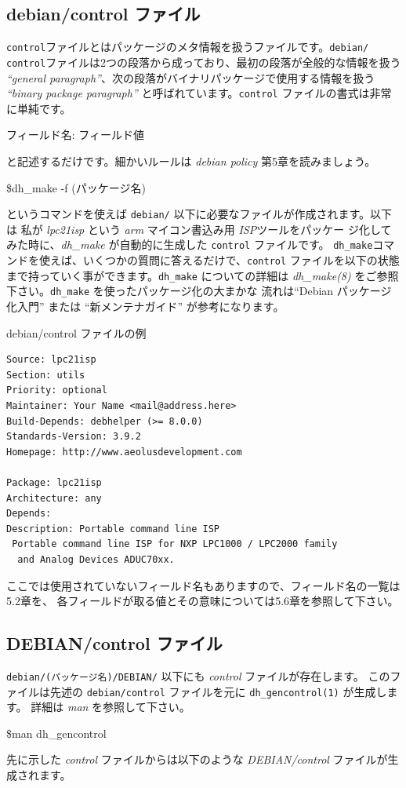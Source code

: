 \documentclass[mingoth,a4paper]{jsarticle}
\begin{document}
\subsection{debian/control ファイル}
{\tt control}ファイルとはパッケージのメタ情報を扱うファイルです。{\tt debian/
control}ファイルは2つの段落から成っており、最初の段落が全般的な情報を扱う {\it
``general paragraph''}、次の段落がバイナリパッケージで使用する情報を扱う {\it
``binary package paragraph''} と呼ばれています。{\tt control} ファイルの書式は非常
に単純です。
\begin{screen}
フィールド名: フィールド値
\end{screen}
と記述するだけです。細かいルールは {\it debian policy} 第5章を読みましょう。
\begin{screen}
\$dh\_make -f (パッケージ名)
\end{screen}
というコマンドを使えば {\tt debian/} 以下に必要なファイルが作成されます。以下は
私が {\it lpc21isp} という {\it arm} マイコン書込み用 {\it ISP}ツールをパッケー
ジ化してみた時に、{\it dh\_make} が自動的に生成した {\tt control} ファイルです。
{\tt dh\_make}コマンドを使えば、いくつかの質問に答えるだけで、{\tt control}
ファイルを以下の状態まで持っていく事ができます。{\tt dh\_make} についての詳細は
{\it dh\_make(8)} をご参照下さい。{\tt dh\_make} を使ったパッケージ化の大まかな
流れは``Debian パッケージ化入門''\cite{packaging-tutorial}
または ``新メンテナガイド''\cite{maint-guide-ja}
が参考になります。
\begin{itembox}[l]{debian/control ファイルの例}
\begin{verbatim}
Source: lpc21isp
Section: utils
Priority: optional
Maintainer: Your Name <mail@address.here>
Build-Depends: debhelper (>= 8.0.0)
Standards-Version: 3.9.2
Homepage: http://www.aeolusdevelopment.com

Package: lpc21isp
Architecture: any
Depends:
Description: Portable command line ISP
 Portable command line ISP for NXP LPC1000 / LPC2000 family
  and Analog Devices ADUC70xx.
\end{verbatim}
\end{itembox}
ここでは使用されていないフィールド名もありますので、フィールド名の一覧は5.2章を、
各フィールドが取る値とその意味については5.6章を参照して下さい。

\subsection{DEBIAN/control ファイル}
{\tt debian/(パッケージ名)/DEBIAN/} 以下にも {\it control} ファイルが存在します。
このファイルは先述の {\tt debian/control} ファイルを元に {\tt dh\_gencontrol(1)} が生成します。
詳細は {\it man} を参照して下さい。\\
\begin{screen}
\$man dh\_gencontrol
\end{screen}
先に示した {\it control} ファイルからは以下のような {\it DEBIAN/control} ファイルが生成されます。
\end{document}
